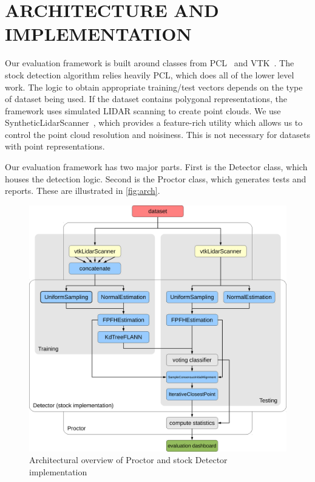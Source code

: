 \section{ARCHITECTURE AND IMPLEMENTATION}
Our evaluation framework is built around classes from PCL~\cite{PCL} and VTK~\cite{vtk}.
The stock detection algorithm relies heavily PCL, which does all of the lower level work.
The logic to obtain appropriate training/test vectors depends on the type of dataset being used.
If the dataset contains polygonal representations, the framework uses simulated LIDAR scanning to create point clouds.
We use SyntheticLidarScanner~\cite{Doria2009}, which provides a feature-rich utility which allows us to control the point cloud resolution and noisiness.
This is not necessary for datasets with point representations.

Our evaluation framework has two major parts. First is the Detector class, which houses the detection logic. Second is the Proctor class, which generates tests and reports. These are illustrated in \autoref{fig:arch}.

\begin{figure}[thpb]
  \centering
  \includegraphics[width=\columnwidth]{../figures/architecture.pdf}
  \caption{Architectural overview of Proctor and stock Detector implementation}
  \label{fig:arch}
\end{figure}

